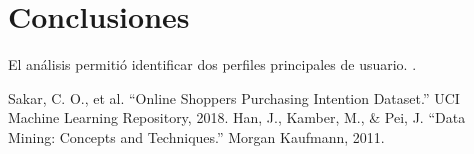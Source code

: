 \documentclass[conference]{IEEEtran}
\begin{document}
\section{Conclusiones}
El análisis permitió identificar dos perfiles principales de usuario. .

\begin{thebibliography}{99}
 Sakar, C. O., et al. “Online Shoppers Purchasing Intention Dataset.” UCI Machine Learning Repository, 2018.
 Han, J., Kamber, M., \& Pei, J. “Data Mining: Concepts and Techniques.” Morgan Kaufmann, 2011.
\end{thebibliography}
\end{document}
